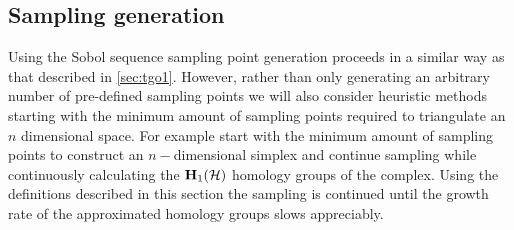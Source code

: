\subsection{Sampling generation}
Using the Sobol sequence sampling point generation proceeds in a similar way as that described in \autoref{sec:tgo1}. However, rather than only generating an arbitrary number of pre-defined sampling points we will also consider heuristic methods starting with the minimum amount of sampling points required to triangulate an $n$ dimensional space. For example start with the minimum amount of sampling points to construct an $n-$dimensional simplex and continue sampling while continuously calculating the $\bold{H}_1 (\mathcal{H})$ homology groups of the complex. Using the definitions described in this section the sampling is continued until the growth rate of the approximated homology groups slows appreciably. %





